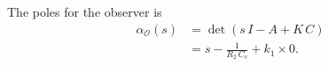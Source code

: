 The poles for the observer is 
\begin{align*}
    \alpha_\mathcal{O}(s) &= \det\left(s\,I - A + K\,C\right) \\
    &= s - \frac{1}{R_2\,C_c} + k_1\times 0.
\end{align*}

% 
% 
